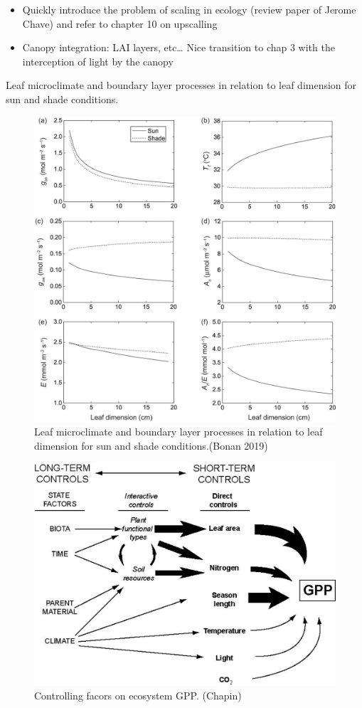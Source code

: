 \documentclass[12pt,oneside]{book}
\providecommand{\tightlist}{%
  \setlength{\itemsep}{0pt}\setlength{\parskip}{0pt}}
\begin{document}
\begin{itemize}
\tightlist
\item
  Quickly introduce the problem of scaling in ecology (review paper of
  Jerome Chave) and refer to chapter 10 on upscalling
\item
  Canopy integration: LAI layers, etc\ldots{} Nice transition to chap 3
  with the interception of light by the canopy
\end{itemize}

Leaf microclimate and boundary layer processes in relation to leaf
dimension for sun and shade conditions.

\begin{figure}

{\centering \includegraphics[width=0.8\linewidth]{figures/chap2/sun_shade} 

}

\caption{Leaf microclimate and boundary layer processes in relation to leaf dimension for sun and shade conditions.(Bonan 2019)}\label{fig:f221}
\end{figure}

\begin{figure}

{\centering \includegraphics[width=0.8\linewidth]{figures/chap2/GPPcontrols} 

}

\caption{Controlling facors on ecosystem GPP. (Chapin)}\label{fig:f222}
\end{figure}
\end{document}
